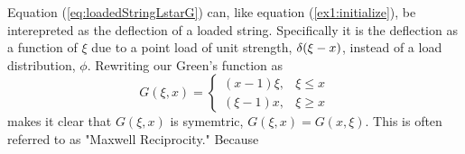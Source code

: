 \begin{example}
    Equation (\ref{eq:loadedStringLstarG}) can, like equation (\ref{ex1:initialize}), be interepreted as the deflection of a loaded string. Specifically it is the deflection as a function of \(\xi\) due to a point load of unit strength, \(\delta(\xi-x)\), instead of a load distribution, \(\phi\). Rewriting our Green's function as
    \begin{equation}
        G(\xi,x)= \begin{cases}
            (x-1)\xi, & \xi \leq x\\
            (\xi-1)x, & \xi \geq x
        \end{cases}
    \end{equation}
    makes it clear that \(G(\xi,x)\) is symemtric, \(G(\xi,x)=G(x,\xi)\). This is often referred to as "Maxwell Reciprocity." Because 
\end{example}
